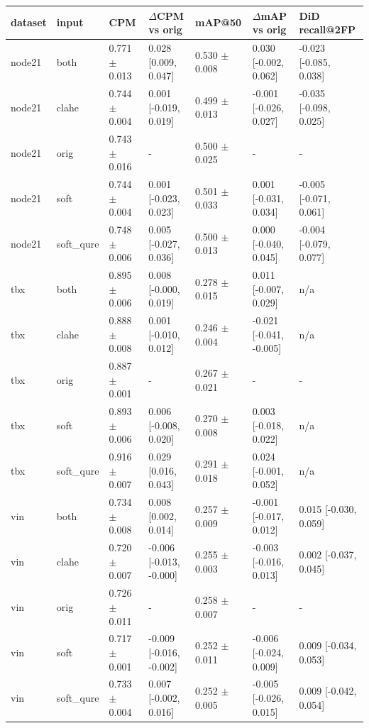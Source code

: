 \begin{tabular}{lllllll}
\toprule
dataset & input & CPM & $\Delta$CPM vs orig & mAP@50 & $\Delta$mAP vs orig & DiD recall@2FP \\
\midrule
node21 & both & 0.771 $\pm$ 0.013 & 0.028 [0.009, 0.047] & 0.530 $\pm$ 0.008 & 0.030 [-0.002, 0.062] & -0.023 [-0.085, 0.038] \\
node21 & clahe & 0.744 $\pm$ 0.004 & 0.001 [-0.019, 0.019] & 0.499 $\pm$ 0.013 & -0.001 [-0.026, 0.027] & -0.035 [-0.098, 0.025] \\
node21 & orig & 0.743 $\pm$ 0.016 & - & 0.500 $\pm$ 0.025 & - & - \\
node21 & soft & 0.744 $\pm$ 0.004 & 0.001 [-0.023, 0.023] & 0.501 $\pm$ 0.033 & 0.001 [-0.031, 0.034] & -0.005 [-0.071, 0.061] \\
node21 & soft\_qure & 0.748 $\pm$ 0.006 & 0.005 [-0.027, 0.036] & 0.500 $\pm$ 0.013 & 0.000 [-0.040, 0.045] & -0.004 [-0.079, 0.077] \\
tbx & both & 0.895 $\pm$ 0.006 & 0.008 [-0.000, 0.019] & 0.278 $\pm$ 0.015 & 0.011 [-0.007, 0.029] & n/a \\
tbx & clahe & 0.888 $\pm$ 0.008 & 0.001 [-0.010, 0.012] & 0.246 $\pm$ 0.004 & -0.021 [-0.041, -0.005] & n/a \\
tbx & orig & 0.887 $\pm$ 0.001 & - & 0.267 $\pm$ 0.021 & - & - \\
tbx & soft & 0.893 $\pm$ 0.006 & 0.006 [-0.008, 0.020] & 0.270 $\pm$ 0.008 & 0.003 [-0.018, 0.022] & n/a \\
tbx & soft\_qure & 0.916 $\pm$ 0.007 & 0.029 [0.016, 0.043] & 0.291 $\pm$ 0.018 & 0.024 [-0.001, 0.052] & n/a \\
vin & both & 0.734 $\pm$ 0.008 & 0.008 [0.002, 0.014] & 0.257 $\pm$ 0.009 & -0.001 [-0.017, 0.012] & 0.015 [-0.030, 0.059] \\
vin & clahe & 0.720 $\pm$ 0.007 & -0.006 [-0.013, -0.000] & 0.255 $\pm$ 0.003 & -0.003 [-0.016, 0.013] & 0.002 [-0.037, 0.045] \\
vin & orig & 0.726 $\pm$ 0.011 & - & 0.258 $\pm$ 0.007 & - & - \\
vin & soft & 0.717 $\pm$ 0.001 & -0.009 [-0.016, -0.002] & 0.252 $\pm$ 0.011 & -0.006 [-0.024, 0.009] & 0.009 [-0.034, 0.053] \\
vin & soft\_qure & 0.733 $\pm$ 0.004 & 0.007 [-0.002, 0.016] & 0.252 $\pm$ 0.005 & -0.005 [-0.026, 0.015] & 0.009 [-0.042, 0.054] \\
\bottomrule
\end{tabular}

